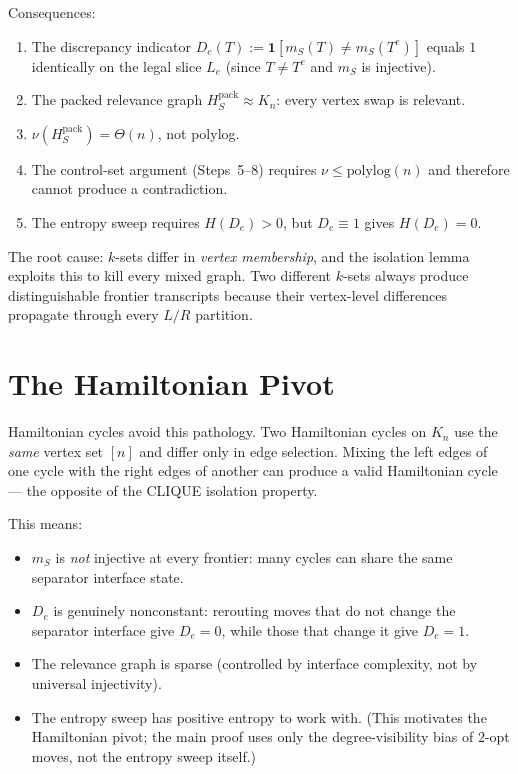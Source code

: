 \documentclass[11pt]{article}
\begin{document}
Consequences:
\begin{enumerate}
\item The discrepancy indicator
  $D_e(T) := \mathbf{1}[m_S(T) \neq m_S(T^e)]$
  equals $1$ identically on the legal slice $L_e$
  (since $T \neq T^e$ and $m_S$ is injective).
\item The packed relevance graph
  $H_S^{\mathrm{pack}} \approx K_n$: every vertex swap
  is relevant.
\item $\nu(H_S^{\mathrm{pack}}) = \Theta(n)$, not polylog.
\item The control-set argument
  (Steps~5--8) requires $\nu \le \mathrm{polylog}(n)$ and
  therefore cannot produce a contradiction.
\item The entropy sweep requires $H(D_e) > 0$, but
  $D_e \equiv 1$ gives $H(D_e) = 0$.
\end{enumerate}

The root cause: $k$-sets differ in \emph{vertex membership},
and the isolation lemma exploits this to kill every mixed
graph.  Two different $k$-sets always produce distinguishable
frontier transcripts because their vertex-level differences
propagate through every $L/R$ partition.

\section{The Hamiltonian Pivot}
\label{sec:hamiltonian-pivot}

Hamiltonian cycles avoid this pathology.  Two Hamiltonian
cycles on $K_n$ use the \emph{same} vertex set $[n]$ and
differ only in edge selection.  Mixing the left edges of one
cycle with the right edges of another can produce a valid
Hamiltonian cycle --- the opposite of the CLIQUE isolation
property.

This means:
\begin{itemize}
\item $m_S$ is \emph{not} injective at every frontier:
  many cycles can share the same separator interface state.
\item $D_e$ is genuinely nonconstant: rerouting moves that
  do not change the separator interface give $D_e = 0$,
  while those that change it give $D_e = 1$.
\item The relevance graph is sparse (controlled by interface
  complexity, not by universal injectivity).
\item The entropy sweep has positive entropy to work with.
  (This motivates the Hamiltonian pivot; the main proof uses only
  the degree-visibility bias of $2$-opt moves, not the entropy
  sweep itself.)
\end{itemize}
\end{document}
